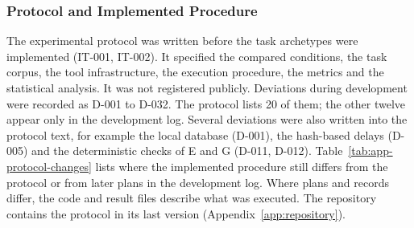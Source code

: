 \subsubsection{Protocol and Implemented Procedure}
\label{app:protocol/changes}

The experimental protocol was written before the task archetypes were implemented (IT-001, IT-002). It specified the compared conditions, the task corpus, the tool infrastructure, the execution procedure, the metrics and the statistical analysis. It was not registered publicly. Deviations during development were recorded as D-001 to D-032. The protocol lists 20 of them; the other twelve appear only in the development log. Several deviations were also written into the protocol text, for example the local database (D-001), the hash-based delays (D-005) and the deterministic checks of E and G (D-011, D-012). Table~\ref{tab:app-protocol-changes} lists where the implemented procedure still differs from the protocol or from later plans in the development log. Where plans and records differ, the code and result files describe what was executed. The repository contains the protocol in its last version (Appendix~\ref{app:repository}).

